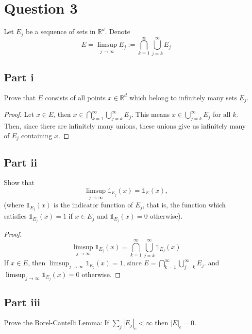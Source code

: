 \section{Question 3}

\begin{question}
    Let $E_j$ be a sequence of sets in $\mathbb{R}^d$. Denote
    $$
    E=\limsup _{j \rightarrow \infty} E_j:=\bigcap_{k=1}^{\infty} \bigcup_{j=k}^{\infty} E_j
    $$
\end{question}

\subsection{Part i}

\begin{question}
    Prove that $E$ consists of all points $x \in \mathbb{R}^d$ which belong to infinitely many sets $E_j$.
\end{question}

\begin{answer}
    \begin{proof}
        Let $x \in E$, then $x \in \bigcap_{k=1}^{\infty} \bigcup_{j=k}^{\infty} E_j$. This means $x \in \bigcup_{j=k}^{\infty} E_j$ for all $k$. Then, since there are infinitely many unions, these unions give us infinitely many of $E_j$ containing $x$.
    \end{proof}
\end{answer}

\subsection{Part ii}

\begin{question}
    Show that
    $$
    \limsup _{j \rightarrow \infty} \mathbb{1}_{E_j}(x)=\mathbb{1}_E(x),
    $$
    (where $\mathbb{1}_{E_j}(x)$ is the indicator function of $E_j$, that is, the function which satisfies $\mathbb{1}_{E_j}(x)=1$ if $x \in E_j$ and $\mathbb{1}_{E_j}(x)=0$ otherwise).
\end{question}

\begin{answer}
    \begin{proof}
        \begin{equation}
        \limsup _{j \rightarrow \infty} \mathbb{1}_{E_j}(x)=\bigcap_{k=1}^{\infty} \bigcup_{j=k}^{\infty} \mathbb{1}_{E_j}(x)
    \end{equation}
    If $x \in E$, then $\limsup _{j \rightarrow \infty} \mathbb{1}_{E_j}(x) = 1$, since $E=\bigcap_{k=1}^{\infty} \bigcup_{j=k}^{\infty} E_j$. and $\limsup _{j \rightarrow \infty} \mathbb{1}_{E_j}(x) = 0$ otherwise.
    \end{proof}
\end{answer}

\subsection{Part iii}

\begin{question}
   Prove the Borel-Cantelli Lemma: If $\sum_j\left|E_j\right|_e<\infty$ then $|E|_e=0$.
\end{question}

\begin{answer}
    
\end{answer}
